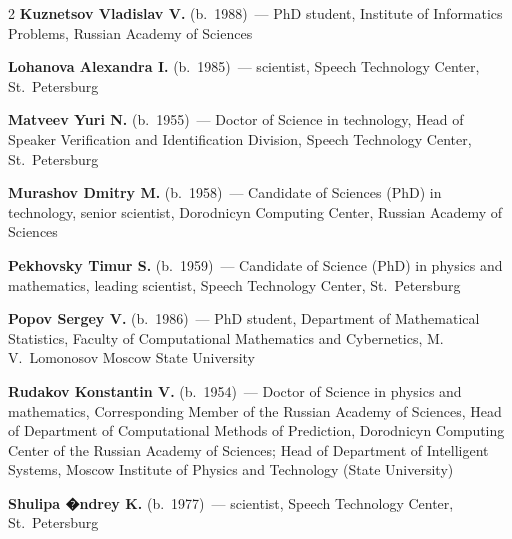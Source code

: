 \begin{multicols}{2}
\noindent
\textbf{Kuznetsov Vladislav V.} (b.\ 1988)~--- PhD student, 
Institute of Informatics Problems, Russian Academy of Sciences 

\vspace*{5pt}

\noindent
\textbf{Lohanova Alexandra I.} (b.\ 1985)~--- scientist,
 Speech Technology Center, St.~Petersburg

\vspace*{5pt}

\noindent
\textbf{Matveev Yuri N.} (b.\ 1955)~--- Doctor of Science in technology, Head of 
Speaker Verification and Identification Division, Speech Technology Center, St.~Petersburg

\vspace*{5pt}

\noindent
\textbf{Murashov Dmitry M.} (b.\ 1958)~--- Candidate of Sciences (PhD) in technology, 
senior scientist, Dorodnicyn Computing Center, Russian Academy of Sciences

\vspace*{5pt}

\noindent
\textbf{Pekhovsky Timur S.} (b.\ 1959)~--- Candidate of Science (PhD) in physics and mathematics, 
leading scientist, Speech Technology Center, St.~Petersburg

\vspace*{5pt}

\noindent
\textbf{Popov Sergey V.} (b.\ 1986)~--- PhD student, Department 
of Mathematical Statistics, Faculty of Computational Mathematics 
and Cybernetics, M.\,V.~Lomonosov Moscow State University

\vspace*{5pt}

\noindent
\textbf{Rudakov Konstantin V.} (b.\ 1954)~--- Doctor of Science in physics and mathematics, 
Corresponding Member of the Russian Academy of Sciences, 
Head of Department of Computational Methods of Prediction, 
Dorodnicyn Computing Center of the Russian Academy of Sciences; 
Head of Department of Intelligent Systems, Moscow Institute of
Physics and Technology (State University)



\vspace*{6pt}

\noindent
\textbf{Shulipa �ndrey K.} (b.\ 1977)~--- scientist, 
 Speech Technology Center, St.~Petersburg


\vspace*{4pt}


\end{multicols}
